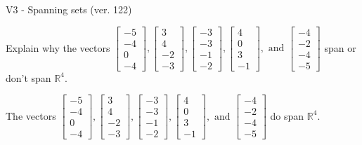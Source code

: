 \begin{exercise}
  \begin{exerciseTitle}V3 - Spanning sets (ver. 122)\end{exerciseTitle}
  \begin{exerciseStatement}
    Explain why the vectors \(\left[\begin{array}{r}
-5 \\
-4 \\
0 \\
-4
\end{array}\right] , \left[\begin{array}{r}
3 \\
4 \\
-2 \\
-3
\end{array}\right] , \left[\begin{array}{r}
-3 \\
-3 \\
-1 \\
-2
\end{array}\right] , \left[\begin{array}{r}
4 \\
0 \\
3 \\
-1
\end{array}\right] , \text{ and } \left[\begin{array}{r}
-4 \\
-2 \\
-4 \\
-5
\end{array}\right]\) span or don't span \(\mathbb{R}^4\). 
	


  \end{exerciseStatement}
  \begin{exerciseAnswer}
   The vectors \(\left[\begin{array}{r}
-5 \\
-4 \\
0 \\
-4
\end{array}\right] , \left[\begin{array}{r}
3 \\
4 \\
-2 \\
-3
\end{array}\right] , \left[\begin{array}{r}
-3 \\
-3 \\
-1 \\
-2
\end{array}\right] , \left[\begin{array}{r}
4 \\
0 \\
3 \\
-1
\end{array}\right] , \text{ and } \left[\begin{array}{r}
-4 \\
-2 \\
-4 \\
-5
\end{array}\right]\) 
  	 do  
	span \(\mathbb{R}^4\).
  



\end{exerciseAnswer}
\end{exercise}
